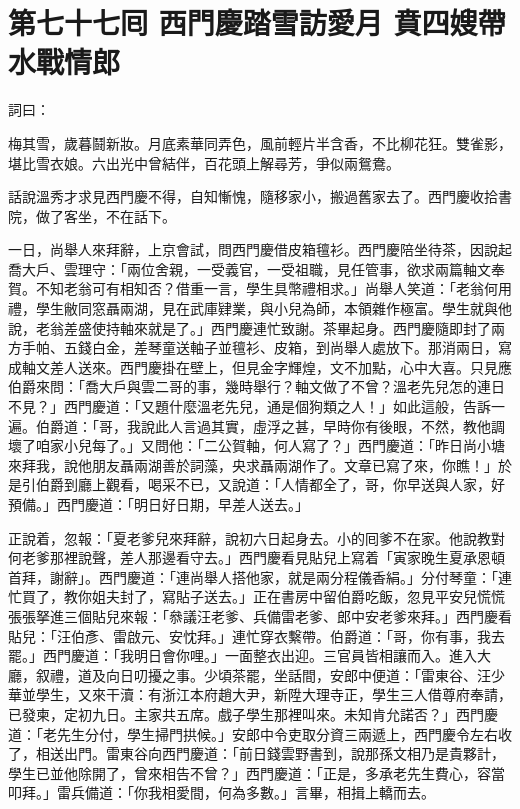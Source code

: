 
\chapter*{第七十七囘 西門慶踏雪訪愛月 賁四嫂帶水戰情郎}


詞曰：

\begin{myquote} 
梅其雪，歲暮鬪新妝。月底素華同弄色，風前輕片半含香，不比柳花狂。雙雀影，堪比雪衣娘。六出光中曾結伴，百花頭上解尋芳，爭似兩鴛鴦。

\end{myquote} 

話說溫秀才求見西門慶不得，自知慚愧，隨移家小，搬過舊家去了。西門慶收拾書院，做了客坐，不在話下。

一日，尚舉人來拜辭，上京會試，問西門慶借皮箱氊衫。西門慶陪坐待茶，因說起喬大戶、雲理守：「兩位舍親，一受義官，一受祖職，見任管事，欲求兩篇軸文奉賀。不知老翁可有相知否？借重一言，學生具幣禮相求。」尚舉人笑道：「老翁何用禮，學生敝同窓聶兩湖，見在武庫肄業，與小兒為師，本領雜作極富。學生就與他說，老翁差盛使持軸來就是了。」西門慶連忙致謝。茶畢起身。西門慶隨即封了兩方手帕、五錢白金，差琴童送軸子並氊衫、皮箱，到尚舉人處放下。那消兩日，寫成軸文差人送來。西門慶掛在壁上，但見金字輝煌，文不加點，心中大喜。只見應伯爵來問：「喬大戶與雲二哥的事，幾時舉行？軸文做了不曾？溫老先兒怎的連日不見？」西門慶道：「又題什麼溫老先兒，通是個狗類之人！」如此這般，告訴一遍。伯爵道：「哥，我說此人言過其實，虛浮之甚，早時你有後眼，不然，教他調壞了咱家小兒每了。」又問他：「二公賀軸，何人寫了？」西門慶道：「昨日尚小塘來拜我，說他朋友聶兩湖善於詞藻，央求聶兩湖作了。文章已寫了來，你瞧！」於是引伯爵到廳上觀看，喝采不已，又說道：「人情都全了，哥，你早送與人家，好預備。」西門慶道：「明日好日期，早差人送去。」

正說着，忽報：「夏老爹兒來拜辭，說初六日起身去。小的囘爹不在家。他說教對何老爹那裡說聲，差人那邊看守去。」西門慶看見貼兒上寫着「寅家晚生夏承恩頓首拜，謝辭」。西門慶道：「連尚舉人搭他家，就是兩分程儀香絹。」分付琴童：「連忙買了，教你姐夫封了，寫貼子送去。」正在書房中留伯爵吃飯，忽見平安兒慌慌張張拏進三個貼兒來報：「叅議汪老爹、兵備雷老爹、郎中安老爹來拜。」西門慶看貼兒：「汪伯彥、雷啟元、安忱拜。」連忙穿衣繫帶。伯爵道：「哥，你有事，我去罷。」西門慶道：「我明日會你哩。」一面整衣出迎。三官員皆相讓而入。進入大廳，叙禮，道及向日叨擾之事。少頃茶罷，坐話間，安郎中便道：「雷東谷、汪少華並學生，又來干瀆：有浙江本府趙大尹，新陞大理寺正，學生三人借尊府奉請，已發柬，定初九日。主家共五席。戲子學生那裡叫來。未知肯允諾否？」西門慶道：「老先生分付，學生掃門拱候。」{}安郎中令吏取分資三兩遞上，西門慶令左右收了，相送出門。雷東谷向西門慶道：「前日錢雲野書到，說那孫文相乃是貴夥計，學生已並他除開了，曾來相告不曾？」西門慶道：「正是，多承老先生費心，容當叩拜。」雷兵備道：「你我相愛間，何為多數。」言畢，相揖上轎而去。

